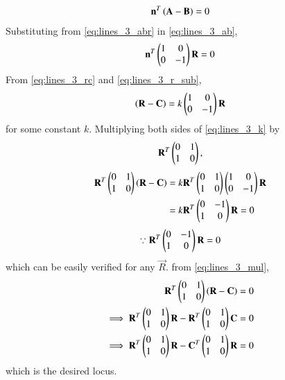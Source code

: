 \begin{enumerate}[label=\arabic*.,ref=\thesubsection.\theenumi]
\begin{align}
\mathbf{n}^T\left(\mathbf{A} - \mathbf{B}\right) = 0
\label{eq:lines_3_ab}
\end{align}
%
Substituting from \eqref{eq:lines_3_abr} in \eqref{eq:lines_3_ab},
\begin{align}
\mathbf{n}^T\begin{pmatrix}1 & 0 \\ 0 & -1\end{pmatrix}\mathbf{R} = 0
\label{eq:lines_3_r_sub}
\end{align}
%
From \eqref{eq:lines_3_rc} and \eqref{eq:lines_3_r_sub},
\begin{align}
\left(\mathbf{R} - \mathbf{C}\right) = k\begin{pmatrix}1 & 0 \\ 0 & -1\end{pmatrix}\mathbf{R}
\label{eq:lines_3_k}
\end{align}
%
for some constant $k$.
Multiplying both sides of \eqref{eq:lines_3_k} by 
\begin{align}
\mathbf{R}^T\begin{pmatrix}0 & 1 \\ 1 & 0\end{pmatrix},
\end{align}
\begin{align}
\mathbf{R}^T\begin{pmatrix}0 & 1 \\ 1 & 0\end{pmatrix}\left(\mathbf{R} - \mathbf{C}\right) &= k\mathbf{R}^T\begin{pmatrix}0 & 1 \\ 1 & 0\end{pmatrix}\begin{pmatrix}1 & 0 \\ 0 & -1\end{pmatrix}\mathbf{R}
\nonumber \\
&= k\mathbf{R}^T\begin{pmatrix}0 & -1 \\ 1 & 0\end{pmatrix}\mathbf{R} = 0
\label{eq:lines_3_mul}
\end{align}
\begin{align}
\because \mathbf{R}^T\begin{pmatrix}0 & -1 \\ 1 & 0\end{pmatrix}\mathbf{R} = 0
\end{align}
which can be easily verified for any $\vec{R}$.
%
from \eqref{eq:lines_3_mul},
\begin{align}
\mathbf{R}^T\begin{pmatrix}0 & 1 \\ 1 & 0\end{pmatrix}\left(\mathbf{R} - \mathbf{C}\right) = 0
\nonumber \\
\implies \mathbf{R}^T\begin{pmatrix}0 & 1 \\ 1 & 0\end{pmatrix}\mathbf{R} - \mathbf{R}^T\begin{pmatrix}0 & 1 \\ 1 & 0\end{pmatrix}\mathbf{C} = 0
\nonumber \\
\implies \mathbf{R}^T\begin{pmatrix}0 & 1 \\ 1 & 0\end{pmatrix}\mathbf{R} - \mathbf{C}^T\begin{pmatrix}0 & 1 \\ 1 & 0\end{pmatrix}\mathbf{R} = 0
\end{align}
%
which is the desired locus.
\end{enumerate}
